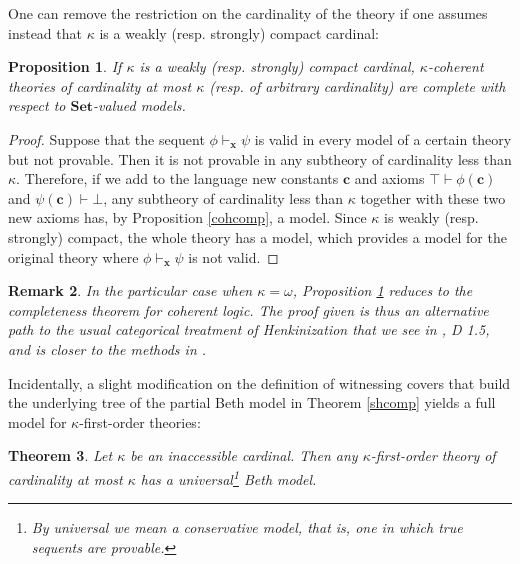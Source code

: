 \documentclass[a4paper,11pt]{article}
\theoremstyle{plain}
\newtheorem{thm}{Theorem}[subsection]
\newtheorem{proposition}[thm]{Proposition}
\newtheorem{rmk}[thm]{Remark}
\theoremstyle{plain}
\theoremstyle{remark}
\newcommand{\Sets}{\ensuremath{\mathbf{Set}}}
\begin{document}
One can remove the restriction on the cardinality of the theory if one assumes instead that $\kappa$ is a weakly (resp. strongly) compact cardinal:

\begin{proposition}\label{scohcomp}
If $\kappa$ is a weakly (resp. strongly) compact cardinal, $\kappa$-coherent theories of cardinality at most $\kappa$ (resp. of arbitrary cardinality) are complete with respect to \Sets-valued models.
\end{proposition}

\begin{proof}
 Suppose that the sequent $\phi \vdash_{\mathbf{x}} \psi$ is valid in every model of a certain theory but not provable. Then it is not provable in any subtheory of cardinality less than $\kappa$. Therefore, if we add to the language new constants $\mathbf{c}$ and axioms $\top \vdash \phi(\mathbf{c})$ and $\psi(\mathbf{c}) \vdash \bot$, any subtheory of cardinality less than $\kappa$ together with these two new axioms has, by Proposition \ref{cohcomp}, a model. Since $\kappa$ is weakly (resp. strongly) compact, the whole theory has a model, which provides a model for the original theory where $\phi \vdash_{\mathbf{x}} \psi$ is not valid.
\end{proof}

\begin{rmk}
 In the particular case when $\kappa=\omega$, Proposition \ref{scohcomp} reduces to the completeness theorem for coherent logic. The proof given is thus an alternative path to the usual categorical treatment of Henkinization that we see in \cite{johnstone}, D 1.5, and is closer to the methods in \cite{clr}.
\end{rmk}

Incidentally, a slight modification on the definition of witnessing covers that build the underlying tree of the partial Beth model in Theorem \ref{shcomp} yields a full model for $\kappa$-first-order theories:

\begin{thm}
 Let $\kappa$ be an inaccessible cardinal. Then any $\kappa$-first-order theory of cardinality at most $\kappa$ has a universal\footnote{By universal we mean a conservative model, that is, one in which true sequents are provable.} Beth model.
\end{thm}
\end{document}
